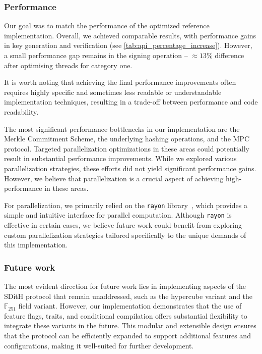 \documentclass[11pt]{report}
\theoremstyle{definition}
\theoremstyle{plain}
\begin{document}
\subsubsection{Performance}

Our goal was to match the performance of the optimized reference implementation. Overall, we achieved comparable results, with performance gains in key generation and verification (see \autoref{tab:api_percentage_increase}). However, a small performance gap remains in the signing operation -- $\approx 13\%$ difference after optimising threads for category one.

It is worth noting that achieving the final performance improvements often requires highly specific and sometimes less readable or understandable implementation techniques, resulting in a trade-off between performance and code readability.

The most significant performance bottlenecks in our implementation are the Merkle Commitment Scheme, the underlying hashing operations, and the MPC protocol. Targeted parallelization optimizations in these areas could potentially result in substantial performance improvements. While we explored various parallelization strategies, these efforts did not yield significant performance gains. However, we believe that parallelization is a crucial aspect of achieving high-performance in these areas.

For parallelization, we primarily relied on the \texttt{rayon} library~\cite{rayon}, which provides a simple and intuitive interface for parallel computation. Although \texttt{rayon} is effective in certain cases, we believe future work could benefit from exploring custom parallelization strategies tailored specifically to the unique demands of this implementation.

\subsubsection{Future work}

The most evident direction for future work lies in implementing aspects of the SDitH protocol that remain unaddressed, such as the hypercube variant and the $\mathbb{F}_{251}$ field variant. However, our implementation demonstrates that the use of feature flags, traits, and conditional compilation offers substantial flexibility to integrate these variants in the future. This modular and extensible design ensures that the protocol can be efficiently expanded to support additional features and configurations, making it well-suited for further development.
\end{document}
